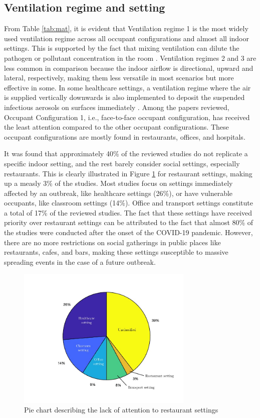 \documentclass[a4paper,12pt]{elsarticle}
\begin{document}
\subsection{Ventilation regime and setting}
From Table \ref{tab:mat}, it is evident that Ventilation regime 1 is the most widely used ventilation regime across all occupant configurations and almost all indoor settings. This is supported by the fact that mixing ventilation can dilute the pathogen or pollutant concentration in the room \cite{srivastava2021effective}. Ventilation regimes 2 and 3 are less common in comparison because the indoor airflow is directional, upward and lateral, respectively, making them less versatile in most scenarios but more effective in some. In some healthcare settings, a ventilation regime where the air is supplied vertically downwards is also implemented to deposit the suspended infectious aerosols on surfaces immediately \cite{lu2022ventilation,lu2020reducing, liu2020full}. Among the papers reviewed, Occupant Configuration 1, i.e., face-to-face occupant configuration, has received the least attention compared to the other occupant configurations. These occupant configurations are mostly found in restaurants, offices, and hospitals.

It was found that approximately 40\% of the reviewed studies do not replicate a specific indoor setting, and the rest barely consider social settings, especially restaurants. This is clearly illustrated in Figure \ref{fig:pie} for restaurant settings, making up a measly 3\% of the studies. Most studies focus on settings immediately affected by an outbreak, like healthcare settings (26\%), or have vulnerable occupants, like classroom settings (14\%). Office and transport settings constitute a total of 17\% of the reviewed studies. The fact that these settings have received priority over restaurant settings can be attributed to the fact that almost 80\% of the studies were conducted after the onset of the COVID-19 pandemic. However, there are no more restrictions on social gatherings in public places like restaurants, cafes, and bars, making these settings susceptible to massive spreading events in the case of a future outbreak.

\begin{figure}[ht]
    \centering
    \includegraphics[width=0.75\textwidth]{figures/pie.jpg}
    \caption{Pie chart describing the lack of attention to restaurant settings}
    \label{fig:pie}
\end{figure}
\end{document}
